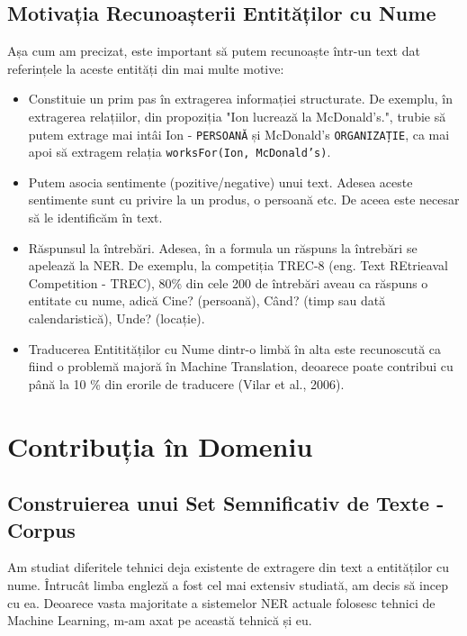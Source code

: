 \subsection{Motivația Recunoașterii Entităților cu Nume}

Așa cum am precizat, este important să putem recunoaște într-un text dat referințele la aceste entități din mai multe motive:

\begin{itemize}
\item Constituie un prim pas în extragerea informației structurate. De exemplu, în extragerea relațiilor, din propoziția "Ion lucrează la McDonald's.", trubie să putem extrage mai intâi Ion - \texttt{PERSOANĂ} și McDonald's \texttt{ORGANIZAȚIE}, ca mai apoi să extragem relația \texttt{worksFor(Ion, McDonald's)}.
\item Putem asocia sentimente (pozitive/negative) unui text. Adesea aceste sentimente sunt cu privire la un produs, o persoană etc. De aceea este necesar să le identificăm în text.
\item Răspunsul la întrebări. Adesea, în a formula un răspuns la întrebări se apelează la NER. De exemplu, la competiția TREC-8 (eng. Text REtrieaval Competition - TREC), 80\% din cele 200 de întrebări aveau ca răspuns o entitate cu nume, adică Cine? (persoană), Când? (timp sau dată calendaristică), Unde? (locație).\cite{trec8}
\item Traducerea Entitităților cu Nume dintr-o limbă în alta este recunoscută ca fiind o problemă majoră în Machine Translation, deoarece poate contribui cu până la 10 \% din erorile de traducere (Vilar et al., 2006).\cite{vilar2006}
\end{itemize}

\section{Contribuția în Domeniu}
\label{sec:contribution}

\subsection{Construierea unui Set Semnificativ de Texte - Corpus}
\label{sub-sec:corpus-building}

Am studiat diferitele tehnici deja existente de extragere din text a entităților cu nume. Întrucât limba engleză a fost cel mai extensiv studiată, am decis să incep cu ea. Deoarece vasta majoritate a sistemelor NER actuale folosesc tehnici de Machine Learning, m-am axat pe această tehnică și eu.

